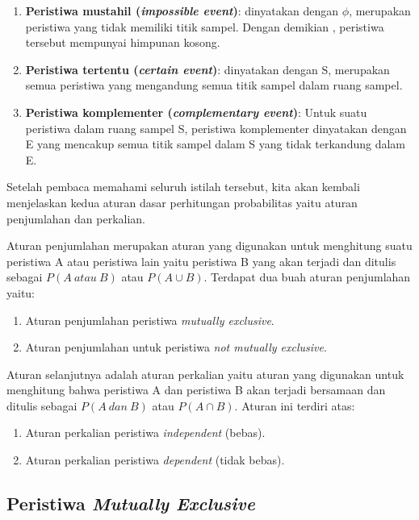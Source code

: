\documentclass[]{book}
\providecommand{\tightlist}{%
  \setlength{\itemsep}{0pt}\setlength{\parskip}{0pt}}
\begin{document}
\begin{enumerate}
\def\labelenumi{\arabic{enumi}.}
\setcounter{enumi}{1}
\tightlist
\item
  \textbf{Peristiwa mustahil (\emph{impossible event})}: dinyatakan
  dengan \(\phi\), merupakan peristiwa yang tidak memiliki titik sampel.
  Dengan demikian , peristiwa tersebut mempunyai himpunan kosong.
\item
  \textbf{Peristiwa tertentu (\emph{certain event})}: dinyatakan dengan
  S, merupakan semua peristiwa yang mengandung semua titik sampel dalam
  ruang sampel.
\item
  \textbf{Peristiwa komplementer (\emph{complementary event})}: Untuk
  suatu peristiwa dalam ruang sampel S, peristiwa komplementer
  dinyatakan dengan E yang mencakup semua titik sampel dalam S yang
  tidak terkandung dalam E.
\end{enumerate}

Setelah pembaca memahami seluruh istilah tersebut, kita akan kembali
menjelaskan kedua aturan dasar perhitungan probabilitas yaitu aturan
penjumlahan dan perkalian.

Aturan penjumlahan merupakan aturan yang digunakan untuk menghitung
suatu peristiwa A atau peristiwa lain yaitu peristiwa B yang akan
terjadi dan ditulis sebagai \(P\left(A\ atau\ B\right)\) atau
\(P\left(A\cup B\right)\). Terdapat dua buah aturan penjumlahan yaitu:

\begin{enumerate}
\def\labelenumi{\arabic{enumi}.}
\tightlist
\item
  Aturan penjumlahan peristiwa \emph{mutually exclusive}.
\item
  Aturan penjumlahan untuk peristiwa \emph{not mutually exclusive}.
\end{enumerate}

Aturan selanjutnya adalah aturan perkalian yaitu aturan yang digunakan
untuk menghitung bahwa peristiwa A dan peristiwa B akan terjadi
bersamaan dan ditulis sebagai \(P\left(A\ dan\ B\right)\) atau
\(P\left(A\cap B\right)\). Aturan ini terdiri atas:

\begin{enumerate}
\def\labelenumi{\arabic{enumi}.}
\tightlist
\item
  Aturan perkalian peristiwa \emph{independent} (bebas).
\item
  Aturan perkalian peristiwa \emph{dependent} (tidak bebas).
\end{enumerate}

\subsection{\texorpdfstring{Peristiwa \emph{Mutually
Exclusive}}{Peristiwa Mutually Exclusive}}\label{peristiwa-mutually-exclusive}
\end{document}
